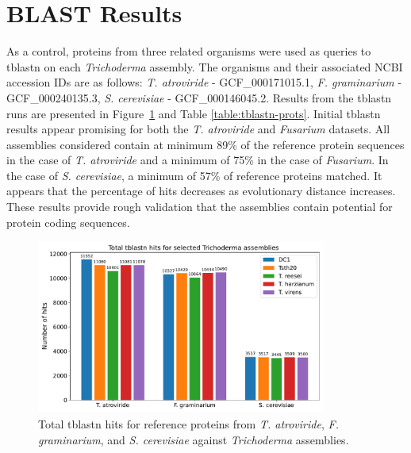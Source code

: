 \section{BLAST Results}
\label{section:blast}

As a control, proteins from three related organisms were used as
queries to tblastn\cite{Altschul1990} on each \textit{Trichoderma}
assembly. The organisms and their associated NCBI accession IDs are as
follows: \textit{T. atroviride} - GCF\_000171015.1,
\textit{F. graminarium} - GCF\_000240135.3, \textit{S. cerevisiae} -
GCF\_000146045.2.  Results from the tblastn runs are presented in
Figure~\ref{fig:blast-total-counts} and Table \ref{table:tblastn-prots}. Initial tblastn results appear
promising for both the \textit{T. atroviride} and \textit{Fusarium}
datasets. All assemblies considered contain at minimum 89\% of the
reference protein sequences in the case of \textit{T. atroviride} and
a minimum of 75\% in the case of \textit{Fusarium}. In the case of
\textit{S. cerevisiae}, a minimum of 57\% of reference proteins
matched. It appears that the percentage of hits decreases as
evolutionary distance increases. These results provide rough
validation that the assemblies contain potential for protein coding
sequences.

\begin{figure}
  \centering
  \includegraphics[width=0.85\textwidth]{figures/blast-total-counts.pdf}
  \caption[Total tblast hits]{Total tblastn hits for reference proteins from \textit{T. atroviride}, \textit{F. graminarium}, and \textit{S. cerevisiae} against \textit{Trichoderma} assemblies.}
  \label{fig:blast-total-counts}
\end{figure}

